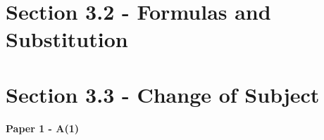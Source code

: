 \documentclass[12pt, a4paper]{article}
\begin{document}
\section*{Section 3.2 - Formulas and Substitution}\label{section:2-3-2}





\section*{Section 3.3 - Change of Subject}\label{section:2-3-3}

\textbf{Paper 1 - A(1)}
\begin{enumx}[label=\arabic*.,start=9]
\item {}\label{DSE2012S-CoreP1-Q02} 
\item {}\label{DSE2012P-CoreP1-Q02} 
\item {}\label{DSE2012-CoreP1-Q02} 
\item {}\label{DSE2013-CoreP1-Q02} 
\item {}\label{DSE2014-CoreP1-Q05} 
\item {}\label{DSE2015-CoreP1-Q02} 
\item {}\label{DSE2016-CoreP1-Q02} 
\item {}\label{DSE2017-CoreP1-Q01} 
\item {}\label{DSE2018-CoreP1-Q01} 
\item {}\label{DSE2019-CoreP1-Q01} 
\item {}\label{DSE2021-CoreP1-Q02} 
\item {}\label{DSE2023-CoreP1-Q01} 
\item {}\label{DSE2024-CoreP1-Q02} 
\end{enumx}
\end{document}
